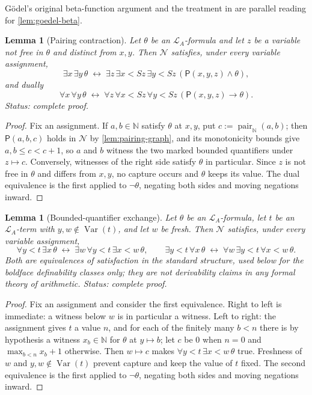 \documentclass[11pt,oneside,openany]{book}
\theoremstyle{definition}
\theoremstyle{plain}
\newtheorem{lemma}[definition]{Lemma}
\theoremstyle{remark}
\newcommand{\N}{\mathbb{N}}
\newcommand{\Lang}{\mathcal{L}}
\newcommand{\defeq}{\mathrel{:=}}
\begin{document}
G\"odel's original beta-function argument \cite{Godel1931} and the
treatment in \cite[ch.~16]{BoolosBurgessJeffrey2007} are parallel reading
for \cref{lem:goedel-beta}.

\begin{lemma}[Pairing contraction]
\label{lem:pair-contraction}
Let \(\theta\) be an \(\Lang_A\)-formula and let \(z\) be a variable not
free in \(\theta\) and distinct from \(x,y\).  Then \(\mathcal N\)
satisfies, under every variable assignment,
\[
  \exists x\,\exists y\,\theta
  \;\leftrightarrow\;
  \exists z\,\exists x<Sz\,\exists y<Sz\,(\mathsf P(x,y,z)\land\theta),
\]
and dually
\[
  \forall x\,\forall y\,\theta
  \;\leftrightarrow\;
  \forall z\,\forall x<Sz\,\forall y<Sz\,(\mathsf P(x,y,z)\to\theta).
\]
\textit{Status: complete proof.}
\end{lemma}

\begin{proof}
Fix an assignment.  If \(a,b\in\N\) satisfy \(\theta\) at \(x,y\), put
\(c\defeq\operatorname{pair}_{\N}(a,b)\); then \(\mathsf P(a,b,c)\) holds
in \(\mathcal N\) by \cref{lem:pairing-graph}, and its monotonicity bounds
give \(a,b\leq c<c+1\), so \(a\) and \(b\) witness the two marked bounded
quantifiers under \(z\mapsto c\).  Conversely, witnesses of the right side
satisfy \(\theta\) in particular.  Since \(z\) is not free in \(\theta\)
and differs from \(x,y\), no capture occurs and \(\theta\) keeps its
value.  The dual equivalence is the first applied to \(\neg\theta\),
negating both sides and moving negations inward.
\end{proof}

\begin{lemma}[Bounded-quantifier exchange]
\label{lem:bounded-collection}
Let \(\theta\) be an \(\Lang_A\)-formula, let \(t\) be an
\(\Lang_A\)-term with \(y,w\notin\operatorname{Var}(t)\), and let \(w\) be
fresh.  Then \(\mathcal N\) satisfies, under every variable assignment,
\[
  \forall y<t\,\exists x\,\theta
  \;\leftrightarrow\;
  \exists w\,\forall y<t\,\exists x<w\,\theta,
  \qquad
  \exists y<t\,\forall x\,\theta
  \;\leftrightarrow\;
  \forall w\,\exists y<t\,\forall x<w\,\theta.
\]
Both are equivalences of satisfaction in the standard structure, used
below for the boldface definability classes only; they are not
derivability claims in any formal theory of arithmetic.
\textit{Status: complete proof.}
\end{lemma}

\begin{proof}
Fix an assignment and consider the first equivalence.  Right to left is
immediate: a witness below \(w\) is in particular a witness.  Left to
right: the assignment gives \(t\) a value \(n\), and for each of the
finitely many \(b<n\) there is by hypothesis a witness \(x_b\in\N\) for
\(\theta\) at \(y\mapsto b\); let \(c\) be \(0\) when \(n=0\) and
\(\max_{b<n}x_b+1\) otherwise.  Then \(w\mapsto c\) makes
\(\forall y<t\,\exists x<w\,\theta\) true.  Freshness of \(w\) and
\(y,w\notin\operatorname{Var}(t)\) prevent capture and keep the value of
\(t\) fixed.  The second equivalence is the first applied to
\(\neg\theta\), negating both sides and moving negations inward.
\end{proof}
\end{document}
